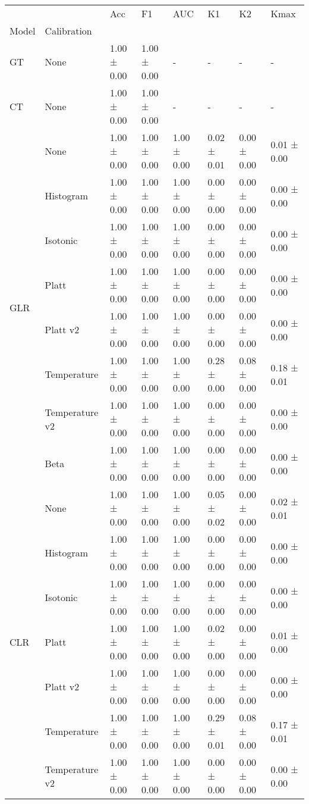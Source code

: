 \begin{tabular}{llllllll}
\toprule
 &  & Acc & F1 & AUC & K1 & K2 & Kmax \\
Model & Calibration &  &  &  &  &  &  \\
\midrule
GT & None & 1.00 ± 0.00 & 1.00 ± 0.00 & - & - & - & - \\
\cline{1-8}
CT & None & 1.00 ± 0.00 & 1.00 ± 0.00 & - & - & - & - \\
\cline{1-8}
\multirow[t]{8}{*}{GLR} & None & 1.00 ± 0.00 & 1.00 ± 0.00 & 1.00 ± 0.00 & 0.02 ± 0.01 & 0.00 ± 0.00 & 0.01 ± 0.00 \\
 & Histogram & 1.00 ± 0.00 & 1.00 ± 0.00 & 1.00 ± 0.00 & 0.00 ± 0.00 & 0.00 ± 0.00 & 0.00 ± 0.00 \\
 & Isotonic & 1.00 ± 0.00 & 1.00 ± 0.00 & 1.00 ± 0.00 & 0.00 ± 0.00 & 0.00 ± 0.00 & 0.00 ± 0.00 \\
 & Platt & 1.00 ± 0.00 & 1.00 ± 0.00 & 1.00 ± 0.00 & 0.00 ± 0.00 & 0.00 ± 0.00 & 0.00 ± 0.00 \\
 & Platt v2 & 1.00 ± 0.00 & 1.00 ± 0.00 & 1.00 ± 0.00 & 0.00 ± 0.00 & 0.00 ± 0.00 & 0.00 ± 0.00 \\
 & Temperature & 1.00 ± 0.00 & 1.00 ± 0.00 & 1.00 ± 0.00 & 0.28 ± 0.00 & 0.08 ± 0.00 & 0.18 ± 0.01 \\
 & Temperature v2 & 1.00 ± 0.00 & 1.00 ± 0.00 & 1.00 ± 0.00 & 0.00 ± 0.00 & 0.00 ± 0.00 & 0.00 ± 0.00 \\
 & Beta & 1.00 ± 0.00 & 1.00 ± 0.00 & 1.00 ± 0.00 & 0.00 ± 0.00 & 0.00 ± 0.00 & 0.00 ± 0.00 \\
\cline{1-8}
\multirow[t]{8}{*}{CLR} & None & 1.00 ± 0.00 & 1.00 ± 0.00 & 1.00 ± 0.00 & 0.05 ± 0.02 & 0.00 ± 0.00 & 0.02 ± 0.01 \\
 & Histogram & 1.00 ± 0.00 & 1.00 ± 0.00 & 1.00 ± 0.00 & 0.00 ± 0.00 & 0.00 ± 0.00 & 0.00 ± 0.00 \\
 & Isotonic & 1.00 ± 0.00 & 1.00 ± 0.00 & 1.00 ± 0.00 & 0.00 ± 0.00 & 0.00 ± 0.00 & 0.00 ± 0.00 \\
 & Platt & 1.00 ± 0.00 & 1.00 ± 0.00 & 1.00 ± 0.00 & 0.02 ± 0.00 & 0.00 ± 0.00 & 0.01 ± 0.00 \\
 & Platt v2 & 1.00 ± 0.00 & 1.00 ± 0.00 & 1.00 ± 0.00 & 0.00 ± 0.00 & 0.00 ± 0.00 & 0.00 ± 0.00 \\
 & Temperature & 1.00 ± 0.00 & 1.00 ± 0.00 & 1.00 ± 0.00 & 0.29 ± 0.01 & 0.08 ± 0.00 & 0.17 ± 0.01 \\
 & Temperature v2 & 1.00 ± 0.00 & 1.00 ± 0.00 & 1.00 ± 0.00 & 0.00 ± 0.00 & 0.00 ± 0.00 & 0.00 ± 0.00 \\

\end{tabular}
